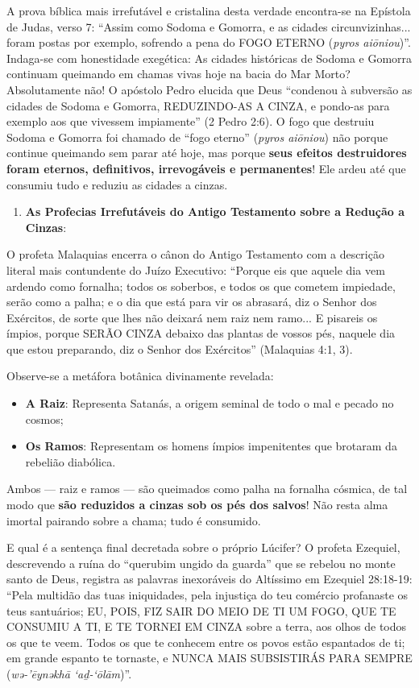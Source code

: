 \documentclass[11pt,a4paper,openany]{book}
\begin{document}
A prova bíblica mais irrefutável e cristalina desta verdade encontra-se na Epístola de Judas, verso 7:
``Assim como Sodoma e Gomorra, e as cidades circunvizinhas... foram postas por exemplo, sofrendo a pena do FOGO ETERNO (\textit{pyros aiōniou})''.
Indaga-se com honestidade exegética: As cidades históricas de Sodoma e Gomorra continuam queimando em chamas vivas hoje na bacia do Mar Morto? Absolutamente não! O apóstolo Pedro elucida que Deus ``condenou à subversão as cidades de Sodoma e Gomorra, REDUZINDO-AS A CINZA, e pondo-as para exemplo aos que vivessem impiamente'' (2 Pedro 2:6).
O fogo que destruiu Sodoma e Gomorra foi chamado de ``fogo eterno'' (\textit{pyros aiōniou}) não porque continue queimando sem parar até hoje, mas porque \textbf{seus efeitos destruidores foram eternos, definitivos, irrevogáveis e permanentes}! Ele ardeu até que consumiu tudo e reduziu as cidades a cinzas.

\begin{enumerate}
  \item \textbf{As Profecias Irrefutáveis do Antigo Testamento sobre a Redução a Cinzas}:
\end{enumerate}

O profeta Malaquias encerra o cânon do Antigo Testamento com a descrição literal mais contundente do Juízo Executivo:
``Porque eis que aquele dia vem ardendo como fornalha; todos os soberbos, e todos os que cometem impiedade, serão como a palha; e o dia que está para vir os abrasará, diz o Senhor dos Exércitos, de sorte que lhes não deixará nem raiz nem ramo... E pisareis os ímpios, porque SERÃO CINZA debaixo das plantas de vossos pés, naquele dia que estou preparando, diz o Senhor dos Exércitos'' (Malaquias 4:1, 3).

Observe-se a metáfora botânica divinamente revelada:
\begin{itemize}
  \item \textbf{A Raiz}: Representa Satanás, a origem seminal de todo o mal e pecado no cosmos;
  \item \textbf{Os Ramos}: Representam os homens ímpios impenitentes que brotaram da rebelião diabólica.
\end{itemize}

Ambos — raiz e ramos — são queimados como palha na fornalha cósmica, de tal modo que \textbf{são reduzidos a cinzas sob os pés dos salvos}! Não resta alma imortal pairando sobre a chama; tudo é consumido.

E qual é a sentença final decretada sobre o próprio Lúcifer? O profeta Ezequiel, descrevendo a ruína do ``querubim ungido da guarda'' que se rebelou no monte santo de Deus, registra as palavras inexoráveis do Altíssimo em Ezequiel 28:18-19:
``Pela multidão das tuas iniquidades, pela injustiça do teu comércio profanaste os teus santuários; EU, POIS, FIZ SAIR DO MEIO DE TI UM FOGO, QUE TE CONSUMIU A TI, E TE TORNEI EM CINZA sobre a terra, aos olhos de todos os que te veem. Todos os que te conhecem entre os povos estão espantados de ti; em grande espanto te tornaste, e NUNCA MAIS SUBSISTIRÁS PARA SEMPRE (\textit{wə-’ēynəkhā ‘aḏ-‘ōlām})''.
\end{document}
